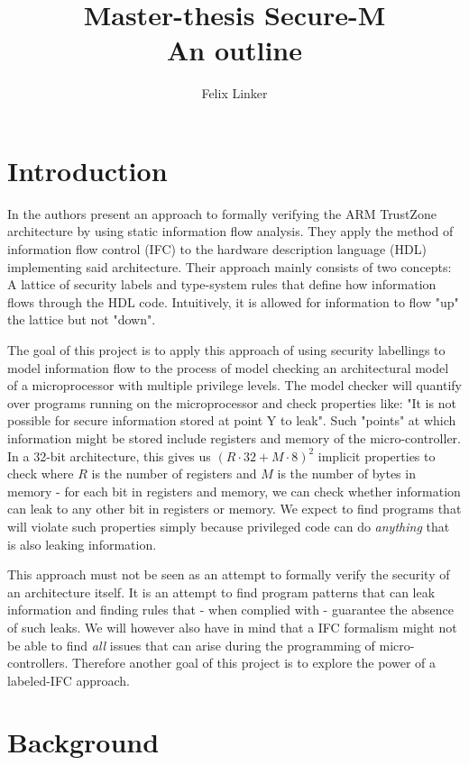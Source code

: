 \documentclass{securem}
\title{Master-thesis Secure-M \\ \large{An outline}}
\author{Felix Linker}
\date{}
\begin{document}
\maketitle

\section{Introduction}

In \cite{Ferraiuolo17} the authors present an approach to formally verifying the ARM TrustZone architecture by using static information flow analysis.
They apply the method of information flow control (IFC) to the hardware description language (HDL) implementing said architecture.
Their approach mainly consists of two concepts: A lattice of security labels and type-system rules that define how information flows through the HDL code.
Intuitively, it is allowed for information to flow "up" the lattice but not "down".

The goal of this project is to apply this approach of using security labellings to model information flow to the process of model checking an architectural model of a microprocessor with multiple privilege levels.
The model checker will quantify over programs running on the microprocessor and check properties like: "It is not possible for secure information stored at point Y to leak".
Such "points" at which information might be stored include registers and memory of the micro-controller.
In a 32-bit architecture, this gives us $ (R \cdot 32 + M \cdot 8)^2 $ implicit properties to check where $ R $ is the number of registers and $ M $ is the number of bytes in memory - for each bit in registers and memory, we can check whether information can leak to any other bit in registers or memory.
We expect to find programs that will violate such properties simply because privileged code can do \textit{anything} that is also leaking information.

This approach must not be seen as an attempt to formally verify the security of an architecture itself.
It is an attempt to find program patterns that can leak information and finding rules that - when complied with - guarantee the absence of such leaks.
We will however also have in mind that a IFC formalism might not be able to find \textit{all} issues that can arise during the programming of micro-controllers.
Therefore another goal of this project is to explore the power of a labeled-IFC approach.

\section{Background}
\end{document}
